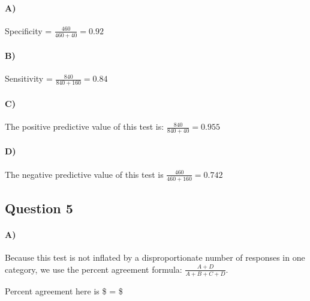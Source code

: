 \documentclass[
]{article}
\begin{document}
\paragraph{A)}\label{a-2}

Specificity = \(\frac{460}{460+40} = 0.92\)

\paragraph{B)}\label{b-2}

Sensitivity = \(\frac{840}{840+160} = 0.84\)

\paragraph{C)}\label{c-2}

The positive predictive value of this test is:
\(\frac{840}{840+40} = 0.955\)

\paragraph{D)}\label{d-2}

The negative predictive value of this test is
\(\frac{460}{460+160} = 0.742\)

\subsection{Question 5}\label{question-5}

\paragraph{A)}\label{a-3}

Because this test is not inflated by a disproportionate number of
responses in one category, we use the percent agreement formula:
\(\frac{A+D}{A+B+C+D}\).

Percent agreement here is \$ = \$
\end{document}
